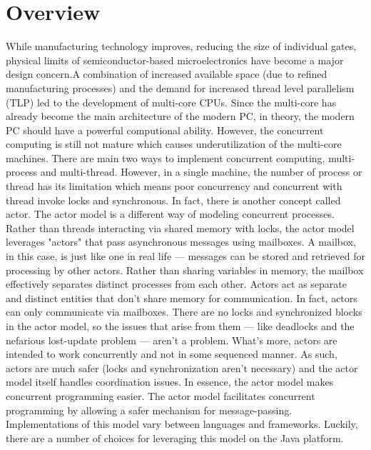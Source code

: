 \documentclass[twocolumn,a4paper,10pt]{article}
\begin{document}
\section{Overview}
While manufacturing technology improves, reducing the size of individual gates, physical limits of semiconductor-based microelectronics have become a major design concern.A combination of increased available space (due to refined manufacturing processes) and the demand for increased thread level parallelism (TLP) led to the development of multi-core CPUs. Since the multi-core has already become the main architecture of the modern PC, in theory, the modern PC should have a powerful computional ability. However, the concurrent computing is still not mature which causes underutilization of the multi-core machines. There are main two ways to implement concurrent computing, multi-process and multi-thread. However, in a single machine, the number of process or thread has its limitation which means poor concurrency and concurrent with thread invoke locks and synchronous. In fact, there is another concept called actor.
\newline
The actor model is a different way of modeling concurrent processes. Rather than threads interacting via shared memory with locks, the actor model leverages "actors" that pass asynchronous messages using mailboxes. A mailbox, in this case, is just like one in real life — messages can be stored and retrieved for processing by other actors. Rather than sharing variables in memory, the mailbox effectively separates distinct processes from each other. Actors act as separate and distinct entities that don't share memory for communication. In fact, actors can only communicate via mailboxes. There are no locks and synchronized blocks in the actor model, so the issues that arise from them — like deadlocks and the nefarious lost-update problem — aren't a problem. What's more, actors are intended to work concurrently and not in some sequenced manner. As such, actors are much safer (locks and synchronization aren't necessary) and the actor model itself handles coordination issues. In essence, the actor model makes concurrent programming easier. The actor model facilitates concurrent programming by allowing a safer mechanism for message-passing. Implementations of this model vary between languages and frameworks. Luckily, there are a number of choices for leveraging this model on the Java platform.
\end{document}
